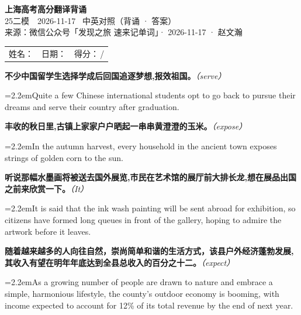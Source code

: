\documentclass[11pt,a4paper]{article}
\newcommand{\num}[1]{\makebox[1.9em][r]{#1.}\hspace{0.3em}}
\newcommand{\prompt}[1]{\emph{\textcolor{tipblue}{\small（#1）}}}
\begin{document}
\pagestyle{plain}
\begin{center}
{\LARGE\bfseries 上海高考高分翻译背诵 }\\[0.25em]
{\large 25二模　2026-11-17 \quad\ 中英对照（背诵 · 答案）}\\[0.35em]
{\footnotesize 来源：微信公众号「发现之旅 速来记单词」· 2026-11-17 · 赵文瀚}
\end{center}

\vspace{0.4em}
\noindent\begin{tabular}{@{}p{}@{}p{}@{}p{}@{}}
姓名：\underline{\hspace{2.0cm}} & 日期：\underline{\hspace{2.0cm}} & 得分：\underline{\hspace{1.4cm}}\,/\enspace 4 \\
\end{tabular}

\vspace{0.5em}

\vspace{0.8em}
\num{1}\textbf{不少中国留学生选择学成后回国追逐梦想,报效祖国。}\prompt{serve}

\vspace{0.15em}

\noindent\hangindent=2.2em\hspace{2.2em}Quite a few Chinese international students opt to go back to pursue their dreams and serve their country after graduation.

\num{2}\textbf{丰收的秋日里,古镇上家家户户晒起一串串黄澄澄的玉米。}\prompt{expose}

\vspace{0.15em}

\noindent\hangindent=2.2em\hspace{2.2em}In the autumn harvest, every household in the ancient town exposes strings of golden corn to the sun.

\num{3}\textbf{听说那幅水墨画将被送去国外展览,市民在艺术馆的展厅前大排长龙,想在展品出国之前来欣赏一下。}\prompt{It}

\vspace{0.15em}

\noindent\hangindent=2.2em\hspace{2.2em}It is said that the ink wash painting will be sent abroad for exhibition, so citizens have formed long queues in front of the gallery, hoping to admire the artwork before it leaves.

\num{4}\textbf{随着越来越多的人向往自然，崇尚简单和谐的生活方式，该县户外经济蓬勃发展,其收入有望在明年年底达到全县总收入的百分之十二。}\prompt{expect}

\vspace{0.15em}

\noindent\hangindent=2.2em\hspace{2.2em}As a growing number of people are drawn to nature and embrace a simple, harmonious lifestyle, the county’s outdoor economy is booming, with income expected to account for 12\% of its total revenue by the end of next year.
\end{document}
